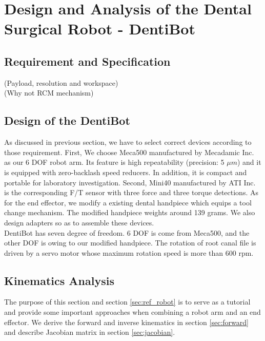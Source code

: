 \chapter{Design and Analysis of the Dental Surgical Robot - DentiBot}
\section{Requirement and Specification}
(Payload, resolution and workspace)														\\
(Why not RCM mechanism)																	
\section{Design of the DentiBot}
As discussed in previous section, we have to select correct devices according to those requirement. First, We choose Meca500 manufactured by Mecadamic Inc. as our 6 DOF robot arm. Its feature is high repeatability (precision: 5 $\mu m$) and it is equipped with zero-backlash speed reducers. In addition, it is compact and portable for laboratory investigation. Second, Mini40 manufactured by ATI Inc. is the corresponding F/T sensor with three force and three torque detections. As for the end effector, we modify a existing dental handpiece which equips a tool change mechanism. The modified handpiece weights around 139 grams. We also design  adapters so as to assemble these devices.\\
DentiBot has seven degree of freedom. 6 DOF is come from Meca500, and the other DOF is owing to our modified handpiece. The rotation of root canal file is driven by a servo motor whose maximum rotation speed is more than 600 rpm.																		
\section{Kinematics Analysis}
\label{sec:kinematics}
The purpose of this section and section \ref{sec:ref_robot} is to serve as a tutorial and provide some important approaches when combining a robot arm and an end effector. We derive the forward and inverse kinematics in section \ref{sec:forward} and describe Jacobian matrix in section \ref{sec:jacobian}. 
